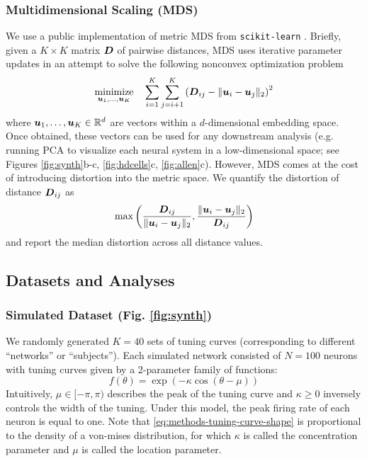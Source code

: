 \subsubsection{Multidimensional Scaling (MDS)}

We use a public implementation of metric MDS from \texttt{scikit-learn} \parencite{scikit}.
Briefly, given a $K \times K$ matrix $\boldsymbol{D}$ of pairwise distances, MDS uses iterative parameter updates in an attempt to solve the following nonconvex optimization problem
\begin{equation}
\underset{\boldsymbol{u}_1, \dots, \boldsymbol{u}_K}{\text{minimize}} \quad \sum_{i=1}^K \sum_{j=i+1}^K \left ( \boldsymbol{D}_{ij} -  \Vert \boldsymbol{u}_i - \boldsymbol{u}_j \Vert_2 \right )^2
\end{equation}
where $\boldsymbol{u}_1, \dots, \boldsymbol{u}_K \in \mathbb{R}^d$ are vectors within a $d$-dimensional embedding space.
Once obtained, these vectors can be used for any downstream analysis (e.g. running PCA to visualize each neural system in a low-dimensional space; see Figures \ref{fig:synth}b-c, \ref{fig:hdcells}c, \ref{fig:allen}c). 
However, MDS comes at the cost of introducing distortion into the metric space. 
We quantify the distortion of distance $\boldsymbol{D}_{ij}$ as
\begin{equation}
\max \left ( \frac{\boldsymbol{D}_{ij}}{\Vert \boldsymbol{u}_i - \boldsymbol{u}_j \Vert_2}, \frac{\Vert \boldsymbol{u}_i - \boldsymbol{u}_j \Vert_2}{\boldsymbol{D}_{ij}} \right ) 
\end{equation}
and report the median distortion across all distance values.

\subsection{Datasets and Analyses}

\subsubsection{Simulated Dataset (Fig. \ref{fig:synth})}

We randomly generated $K = 40$ sets of tuning curves (corresponding to different ``networks'' or ``subjects'').
Each simulated network consisted of $N = 100$ neurons with tuning curves given by a 2-parameter family of functions:
\begin{equation}
\label{eq:methods-tuning-curve-shape}
f(\theta) = \exp \left ( -\kappa \cos (\theta - \mu)\right )
\end{equation}
Intuitively, $\mu \in [-\pi, \pi)$ describes the peak of the tuning curve and $\kappa \geq 0$ inversely controls the width of the tuning.
Under this model, the peak firing rate of each neuron is equal to one.
Note that \cref{eq:methods-tuning-curve-shape} is proportional to the density of a von-mises distribution, for which $\kappa$ is called the concentration parameter and $\mu$ is called the location parameter.

